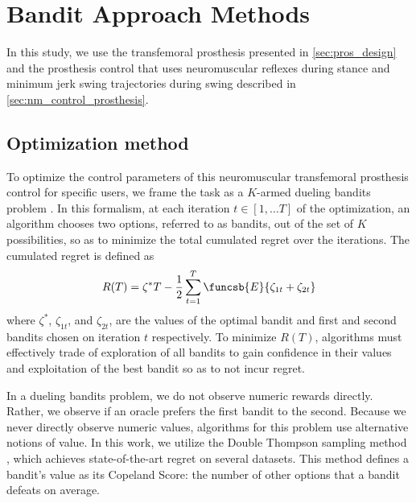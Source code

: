 \section{Bandit Approach Methods}\label{sec:bandit_methods}

In this study, we use the transfemoral prosthesis presented in
\cref{sec:pros_design} and the prosthesis control that uses neuromuscular reflexes
during stance and minimum jerk swing trajectories during swing described in
\cref{sec:nm_control_prosthesis}. 

\subsection{Optimization method}\label{sec:bandit_optimization}

To optimize the control parameters of this neuromuscular transfemoral prosthesis
control for specific users, we frame the task as a $K$-armed dueling bandits
problem \citep{yue2012k}. In this formalism, at each iteration $t \in [1,\ldots
T]$ of the optimization, an algorithm chooses two options, referred to as
bandits, out of the set of $K$ possibilities, so as to minimize the total
cumulated regret over the iterations. The cumulated regret is defined as
\begin{align}
    R(T) = \zeta^* T - \frac{1}{2} \sum_{t=1}^T \funcsb{E}{\zeta_{1t} + \zeta_{2t}}
\end{align}
where $\zeta^*$, $\zeta_{1t}$, and $\zeta_{2t}$, are the values of the optimal
bandit and first and second bandits chosen on iteration $t$ respectively. To
minimize $R(T)$, algorithms must effectively trade of exploration of all bandits
to gain confidence in their values and exploitation of the best bandit so as to
not incur regret.

In a dueling bandits problem, we do not observe numeric rewards directly.
Rather, we observe if an oracle prefers the first bandit to the second.  Because
we never directly observe numeric values, algorithms for this problem use
alternative notions of value. In this work, we utilize the Double Thompson
sampling method \citep{wu2016double}, which achieves state-of-the-art regret on
several datasets. This method defines a bandit's value as its Copeland Score:
the number of other options that a bandit defeats on average.

